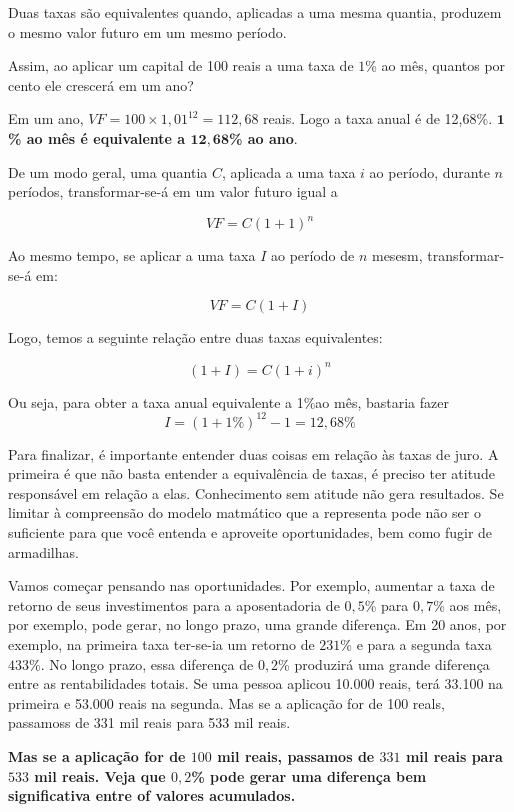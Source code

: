 
Duas taxas são equivalentes quando, aplicadas a uma mesma quantia, produzem o mesmo valor futuro em um mesmo período.

Assim, ao aplicar um capital de 100 reais a uma taxa de $1$\% ao mês, quantos por cento ele crescerá em um ano?

Em um ano, $VF = 100\times 1{,}01^{12} = 112{,}68$ reais. Logo a taxa anual é de 12,68\%. \textbf{$\bm{1}$\% ao mês é equivalente a $\bm{12,68}$\% ao ano}.

De um modo geral, uma quantia $C$, aplicada a uma taxa $i$ ao período, durante $n$ períodos, transformar-se-á em um valor futuro igual a 

$$VF=C(1+1)^n$$

Ao mesmo tempo, se aplicar a uma taxa $I$ ao período de $n$ mesesm, transformar-se-á em:

$$VF=C(1+I)$$

Logo, temos a seguinte relação entre duas taxas equivalentes:

$$(1+I)=C(1+i)^n$$

Ou seja, para obter a taxa anual equivalente a 1\%ao mês, bastaria fazer
$$I=(1+1\%)^{12}-1=12{,}68\%$$

Para finalizar, é importante entender duas coisas em relação às taxas de juro. A primeira é que não basta entender a equivalência de taxas, é preciso ter atitude responsável em relação a elas. Conhecimento sem atitude não gera resultados. Se limitar à compreensão do modelo matmático que a representa pode não ser o suficiente para que você entenda e aproveite oportunidades, bem como fugir de armadilhas.

Vamos começar pensando nas oportunidades. Por exemplo, aumentar a taxa de retorno de seus investimentos para a aposentadoria de $0{,}5$\% para $0{,}7$\% aos mês, por exemplo, pode gerar, no longo prazo, uma grande diferença. Em 20 anos, por exemplo, na primeira taxa ter-se-ia um retorno de $231$\% e para a segunda taxa $433$\%. No longo prazo, essa diferença de $0{,}2$\% produzirá uma grande diferença entre as rentabilidades totais. Se uma pessoa aplicou 10.000 reais, terá 33.100 na primeira e 53.000 reais na segunda. Mas se a aplicação for de 100 reals, passamoss de 331 mil reais para 533 mil reais. 

\textbf{Mas se a aplicação for de $100$ mil reais, passamos de $331$ mil reais para $533$ mil reais. Veja que $0{,}2$\% pode gerar uma diferença bem significativa entre of valores acumulados.}

